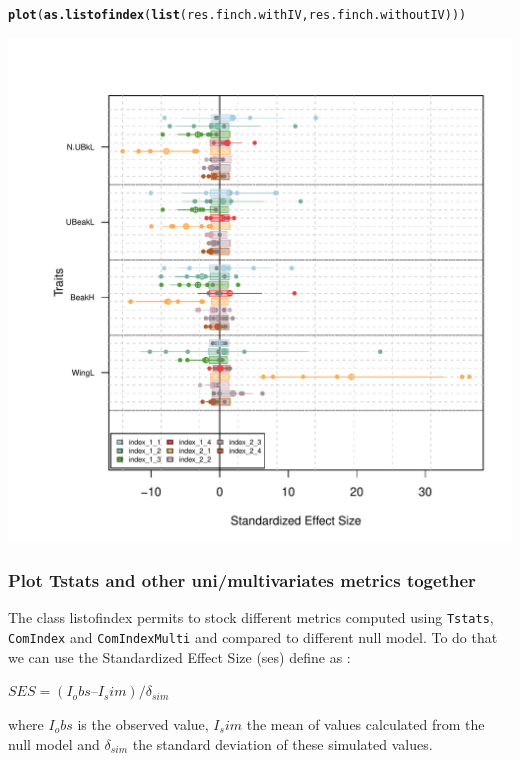 \documentclass[12pt]{article}\usepackage[]{graphicx}\usepackage[]{color}
\makeatletter
\def\maxwidth{ %
  \ifdim\Gin@nat@width>\linewidth
    \linewidth
  \else
    \Gin@nat@width
  \fi
}
\newcommand{\hlstd}[1]{\textcolor[rgb]{0.345,0.345,0.345}{#1}}%
\newcommand{\hlkwd}[1]{\textcolor[rgb]{0.737,0.353,0.396}{\textbf{#1}}}%
\newenvironment{kframe}{%
 \def\at@end@of@kframe{}%
 \ifinner\ifhmode%
  \def\at@end@of@kframe{\end{minipage}}%
  \begin{minipage}{\columnwidth}%
 \fi\fi%
 \def\FrameCommand##1{\hskip\@totalleftmargin \hskip-\fboxsep
 \colorbox{shadecolor}{##1}\hskip-\fboxsep
     \hskip-\linewidth \hskip-\@totalleftmargin \hskip\columnwidth}%
 \MakeFramed {\advance\hsize-\width
   \@totalleftmargin\z@ \linewidth\hsize
   \@setminipage}}%
 {\par\unskip\endMakeFramed%
 \at@end@of@kframe}
\newenvironment{knitrout}{}{} %
\makeatother
\begin{document}
\begin{knitrout}
\color{fgcolor}\begin{kframe}
\begin{alltt}
\hlkwd{plot}\hlstd{(}\hlkwd{as.listofindex}\hlstd{(}\hlkwd{list}\hlstd{(res.finch.withIV, res.finch.withoutIV)))}
\end{alltt}
\end{kframe}
\includegraphics[width=\maxwidth]{figure/unnamed-chunk-47} 

\end{knitrout}

\subsubsection{Plot Tstats and other uni/multivariates metrics together}
The class listofindex permits to stock different metrics computed using \texttt{Tstats}, \texttt{ComIndex} and \texttt{ComIndexMulti} and compared to different null model. To do that we can use the Standardized Effect Size (ses) define as : 

\begin{center}
$SES = (I_obs  I_sim) / \delta_{sim}$
\end{center}

where $I_obs$ is the observed value, $I_sim$ the mean of values calculated from the null model and $\delta_{sim}$ the standard deviation of these simulated values.
\end{document}
